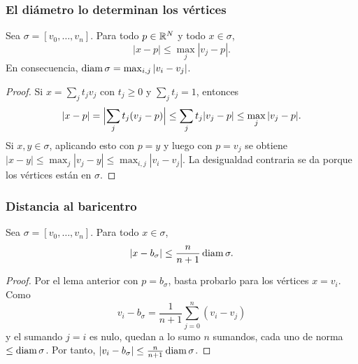 \begin{frame}
  \frametitle{El diámetro lo determinan los vértices}

  \begin{lemma}
    Sea $\sigma=[v_0,\ldots,v_n]$. Para todo $p\in\mathbb{R}^N$ y todo
    $x\in\sigma$,
    \[
      |x-p|\leq\max_j|v_j-p|.
    \]
    En consecuencia, $\operatorname{diam}\sigma=\max_{i,j}|v_i-v_j|$.
  \end{lemma}

  \begin{proof}
    Si $x=\sum_jt_jv_j$ con $t_j\geq0$ y $\sum_jt_j=1$, entonces
    \[
      |x-p|=\Bigl|\sum_jt_j(v_j-p)\Bigr|
      \leq\sum_jt_j|v_j-p|
      \leq\max_j|v_j-p|.
    \]
    Si $x,y\in\sigma$, aplicando esto con $p=y$ y luego con $p=v_j$ se
    obtiene $|x-y|\leq\max_j|v_j-y|\leq\max_{i,j}|v_i-v_j|$. La
    desigualdad contraria se da porque los vértices están en $\sigma$.
  \end{proof}
\end{frame}

\begin{frame}
  \frametitle{Distancia al baricentro}

  \begin{lemma}
    Sea $\sigma=[v_0,\ldots,v_n]$. Para todo $x\in\sigma$,
    \[
      |x-b_\sigma|\leq\frac{n}{n+1}\operatorname{diam}\sigma.
    \]
  \end{lemma}

  \begin{proof}
    Por el lema anterior con $p=b_\sigma$, basta probarlo para los vértices $x=v_i$.
    Como
    \[
      v_i-b_\sigma=\frac{1}{n+1}\sum_{j=0}^n(v_i-v_j)
    \]
    y el sumando $j=i$ es nulo, quedan a lo sumo $n$ sumandos, cada uno de
    norma $\leq\operatorname{diam}\sigma$. Por tanto,
    $|v_i-b_\sigma|\leq\frac{n}{n+1}\operatorname{diam}\sigma$.
  \end{proof}
\end{frame}

